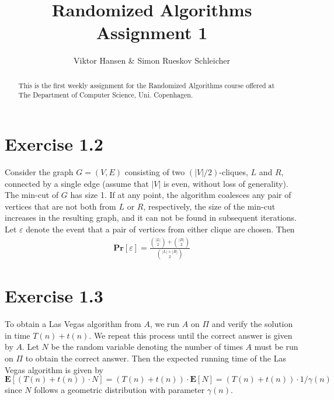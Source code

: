 \documentclass[12pt]{article}
\begin{document}
\nocite{*}


\title{Randomized Algorithms \\
       Assignment 1}

\author{Viktor Hansen \& Simon Rueskov Schleicher}

\maketitle

\begin{abstract}
  This is the first weekly assignment for the Randomized Algorithms course offered at The Department of Computer Science, Uni. Copenhagen.
\end{abstract}

\pagebreak

\section*{Exercise 1.2}
Consider the graph $G=(V,E)$ consisting of two $(\left|V\right|/2)$-cliques, $L$ and $R$, connected by a single edge (assume that $|V|$ is even, without loss of generality). The min-cut of $G$ has size 1. If at any point, the algorithm coalesces any pair of vertices that are not both from $L$ or $R$, respectively, the size of the min-cut increases in the resulting graph, and it can not be found in subsequent iterations. Let $\varepsilon$ denote the event that a pair of vertices from either clique are chosen. Then 
\begin{align*}
\mathbf{Pr}\left[ \varepsilon \right] = \frac{\binom{|L|}{2} + \binom{|R|}{2}}{\binom{|L|+|R|}{2}}
\end{align*}

\section*{Exercise 1.3}
To obtain a Las Vegas algorithm from $A$, we run $A$ on $\Pi$ and verify the solution in time $T(n) + t(n)$. We repeat this process until the correct answer is given by $A$. Let $N$ be the random variable denoting the number of times $A$ must be run on $\Pi$ to obtain the correct answer. Then the expected running time of the Las Vegas algorithm is given by $\mathbf{E}\left[ \left(T(n) + t(n)\right) \cdot N \right] = \left(T(n) + t(n)\right) \cdot \mathbf{E} \left[ N \right] = \left(T(n) + t(n)\right) \cdot 1/\gamma{(n)}$ since $N$ follows a geometric distribution with parameter $\gamma{(n)}$.
\end{document}
